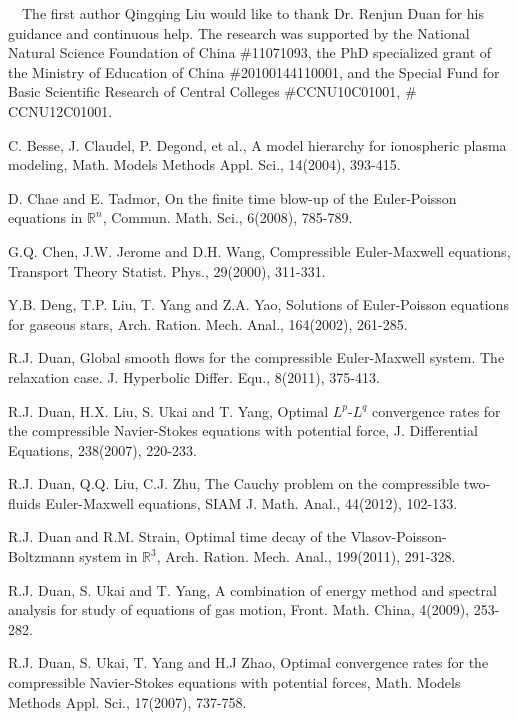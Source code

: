 \documentclass[11pt]{amsart}
\numberwithin{equation}{section}
\begin{document}
\medskip
\medskip
{}\ \  The first author Qingqing Liu
would like to thank Dr. Renjun Duan for his guidance and continuous
help. The research was supported by the National Natural Science
Foundation of China $\#$11071093, the PhD specialized grant of the
Ministry of Education of China $\#$20100144110001, and the Special
Fund for Basic Scientific Research  of Central Colleges
$\#$CCNU10C01001, $\#$CCNU12C01001.

\bigbreak

\begin{thebibliography}{99}

 C. Besse, J. Claudel, P. Degond, et al., A model hierarchy for ionospheric plasma modeling,
Math. Models Methods Appl. Sci., 14(2004), 393-415.

 D. Chae and E. Tadmor, On the finite time blow-up of the Euler-Poisson equations
in $\mathbb{R}^{n}$, Commun. Math. Sci., 6(2008), 785-789.

 G.Q. Chen, J.W. Jerome and D.H. Wang, Compressible Euler-Maxwell equations,
Transport Theory Statist. Phys., 29(2000), 311-331.

 Y.B. Deng, T.P. Liu, T. Yang and Z.A. Yao, Solutions of Euler-Poisson equations for
gaseous stars, Arch. Ration. Mech. Anal., 164(2002), 261-285.

 R.J. Duan, Global
smooth flows for the compressible Euler-Maxwell system. The
relaxation case. J. Hyperbolic Differ. Equ., 8(2011), 375-413.

 R.J. Duan, H.X. Liu, S. Ukai and T. Yang, Optimal $L^p$-$L^q$ convergence rates
for the compressible Navier-Stokes equations with potential force,
J. Differential Equations, 238(2007), 220-233.

 R.J. Duan, Q.Q. Liu, C.J. Zhu, The Cauchy problem on the compressible two-fluids Euler-Maxwell equations,
SIAM J. Math. Anal.,  44(2012), 102-133.

 R.J. Duan and R.M. Strain, Optimal time decay of the
Vlasov-Poisson-Boltzmann system in $\mathbb{R}^{3}$, Arch. Ration.
Mech. Anal., 199(2011), 291-328.

 R.J. Duan, S. Ukai and T. Yang, A combination of energy method and spectral
analysis for study of equations of gas motion, Front. Math. China,
4(2009), 253-282.

 R.J. Duan, S. Ukai, T. Yang and H.J Zhao, Optimal convergence rates for
the compressible Navier-Stokes equations with potential forces,
Math. Models Methods Appl. Sci., 17(2007), 737-758.


\end{thebibliography}
\end{document}

